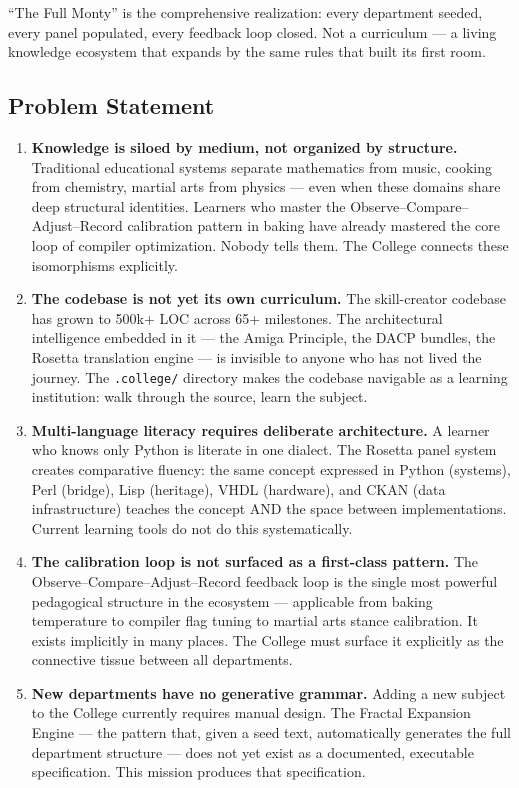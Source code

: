 \documentclass[11pt,letterpaper]{article}
\begin{document}
``The Full Monty'' is the comprehensive realization: every department seeded, every panel populated, every feedback loop closed. Not a curriculum --- a living knowledge ecosystem that expands by the same rules that built its first room.

\subsection{Problem Statement}

\begin{enumerate}[leftmargin=1.5em]
  \item \textbf{Knowledge is siloed by medium, not organized by structure.} Traditional educational systems separate mathematics from music, cooking from chemistry, martial arts from physics --- even when these domains share deep structural identities. Learners who master the Observe--Compare--Adjust--Record calibration pattern in baking have already mastered the core loop of compiler optimization. Nobody tells them. The College connects these isomorphisms explicitly.

  \item \textbf{The codebase is not yet its own curriculum.} The skill-creator codebase has grown to 500k+ LOC across 65+ milestones. The architectural intelligence embedded in it --- the Amiga Principle, the DACP bundles, the Rosetta translation engine --- is invisible to anyone who has not lived the journey. The \texttt{.college/} directory makes the codebase navigable as a learning institution: walk through the source, learn the subject.

  \item \textbf{Multi-language literacy requires deliberate architecture.} A learner who knows only Python is literate in one dialect. The Rosetta panel system creates comparative fluency: the same concept expressed in Python (systems), Perl (bridge), Lisp (heritage), VHDL (hardware), and CKAN (data infrastructure) teaches the concept AND the space between implementations. Current learning tools do not do this systematically.

  \item \textbf{The calibration loop is not surfaced as a first-class pattern.} The Observe--Compare--Adjust--Record feedback loop is the single most powerful pedagogical structure in the ecosystem --- applicable from baking temperature to compiler flag tuning to martial arts stance calibration. It exists implicitly in many places. The College must surface it explicitly as the connective tissue between all departments.

  \item \textbf{New departments have no generative grammar.} Adding a new subject to the College currently requires manual design. The Fractal Expansion Engine --- the pattern that, given a seed text, automatically generates the full department structure --- does not yet exist as a documented, executable specification. This mission produces that specification.
\end{enumerate}
\end{document}
